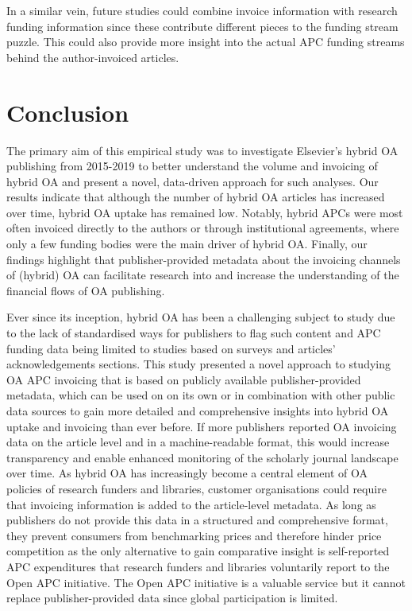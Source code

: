 \documentclass[a4paper,man,floatsintext,longtable,noextraspace,12pt]{apa6}
\begin{document}
In a similar vein, future studies could combine invoice information with
research funding information since these contribute different pieces to
the funding stream puzzle. This could also provide more insight into the
actual APC funding streams behind the author-invoiced articles.

\hypertarget{conclusion}{%
\section{Conclusion}\label{conclusion}}

The primary aim of this empirical study was to investigate Elsevier's
hybrid OA publishing from 2015-2019 to better understand the volume and
invoicing of hybrid OA and present a novel, data-driven approach for
such analyses. Our results indicate that although the number of hybrid
OA articles has increased over time, hybrid OA uptake has remained low.
Notably, hybrid APCs were most often invoiced directly to the authors or
through institutional agreements, where only a few funding bodies were
the main driver of hybrid OA. Finally, our findings highlight that
publisher-provided metadata about the invoicing channels of (hybrid) OA
can facilitate research into and increase the understanding of the
financial flows of OA publishing.

Ever since its inception, hybrid OA has been a challenging subject to
study due to the lack of standardised ways for publishers to flag such
content and APC funding data being limited to studies based on surveys
and articles' acknowledgements sections. This study presented a novel
approach to studying OA APC invoicing that is based on publicly
available publisher-provided metadata, which can be used on on its own
or in combination with other public data sources to gain more detailed
and comprehensive insights into hybrid OA uptake and invoicing than ever
before. If more publishers reported OA invoicing data on the article
level and in a machine-readable format, this would increase transparency
and enable enhanced monitoring of the scholarly journal landscape over
time. As hybrid OA has increasingly become a central element of OA
policies of research funders and libraries, customer organisations could
require that invoicing information is added to the article-level
metadata. As long as publishers do not provide this data in a structured
and comprehensive format, they prevent consumers from benchmarking
prices and therefore hinder price competition as the only alternative to
gain comparative insight is self-reported APC expenditures that research
funders and libraries voluntarily report to the Open APC initiative. The
Open APC initiative is a valuable service but it cannot replace
publisher-provided data since global participation is limited.
\end{document}
